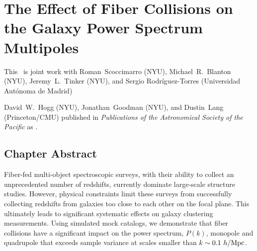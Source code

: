 \renewcommand{\chapid}{obvs}

\chapter{The Effect of Fiber Collisions on the Galaxy Power Spectrum Multipoles}

This \paper\ is joint work with Roman~Scoccimarro (NYU), 
Michael~R.~Blanton (NYU), Jeremy~L.~Tinker (NYU), and 
Sergio Rodr\'{i}guez-Torres (Universidad Aut\'{o}noma de Madrid)

David~W.~Hogg (NYU), Jonathan~Goodman (NYU),
and Dustin~Lang (Princeton/CMU) published in \emph{Publications of the
Astronomical Society of the Pacific} as \citet{Foreman-Mackey:2013}.

\newcommand{\todo}[1]{{\em \textcolor{red}{ #1}}}
\newcommand{\beq}{\begin{equation}}
\newcommand{\eeq}{\end{equation}}
\newcommand{\beqa}{\begin{eqnarray}}
\newcommand{\eeqa}{\end{eqnarray}}

\newcommand{\lexp}{\mathop{\langle}}
\newcommand{\rexp}{\mathop{\rangle}}
\newcommand{\rexpc}{\mathop{\rangle_c}}
\def\k{{\hbox{\BF k}}}
\def\x{{\hbox{\BF x}}}
\def\r{{\hbox{\BF r}}}
\def\s{{\hbox{\BF s}}}
\def\la{\mathrel{\mathpalette\fun <}}
\def\ga{\mathrel{\mathpalette\fun >}}
\def\fun#1#2{\lower3.6pt\vbox{\baselineskip0pt\lineskip.9pt
\ialign{$\mathsurround=0pt#1\hfill##\hfil$\crcr#2\crcr\sim\crcr}}}



\section{Chapter Abstract}
\qquad Fiber-fed multi-object spectroscopic surveys, with their ability to collect an unprecedented number of redshifts, currently dominate large-scale structure studies. However, physical constraints limit these surveys from successfully collecting redshifts from galaxies too close to each other on the focal plane. This ultimately leads to significant systematic effects on galaxy clustering measurements. Using simulated mock catalogs, we demonstrate that fiber collisions have a significant impact on the power spectrum, $P(k)$, monopole and quadrupole that exceeds sample variance at scales smaller than $k\sim0.1~h/{\rm Mpc}$.

